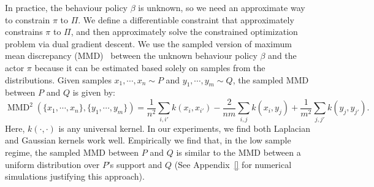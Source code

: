 In practice, the behaviour policy $\beta$ is unknown, so we need an approximate way to constrain $\pi$ to $\Pi$. We define a differentiable constraint that approximately constrains $\pi$ to $\Pi$, and then approximately solve the constrained optimization problem via dual gradient descent.  We use the sampled version of maximum mean discrepancy (MMD)~\cite{gretton2012kernel}
between the unknown behaviour policy $\beta$ and the actor $\pi$ because it can be estimated based solely on samples from the distributions. Given samples $x_1, \cdots, x_n \sim P$ and $y_1, \cdots, y_m \sim Q$, the sampled MMD between $P$ and $Q$ is given by:\\
$$\operatorname{MMD}^2(\{x_1, \cdots, x_n\}, \{y_1, \cdots, y_m\}) = \frac{1}{n^2} \sum_{i, i'} k(x_i, x_{i'}) - \frac{2}{nm} \sum_{i, j} k(x_i, y_j) + \frac{1}{m^2} \sum_{j, j'} k(y_j, y_{j'}).
$$
Here, $k(\cdot, \cdot)$ is any universal kernel. In our experiments, we find both Laplacian and Gaussian kernels work well.
Empirically we find that, in the low sample regime, the sampled MMD between $P$ and $Q$ is similar to the MMD between a uniform distribution over $P$'s support and $Q$ (See Appendix~\ref{} for numerical simulations justifying this approach). %


